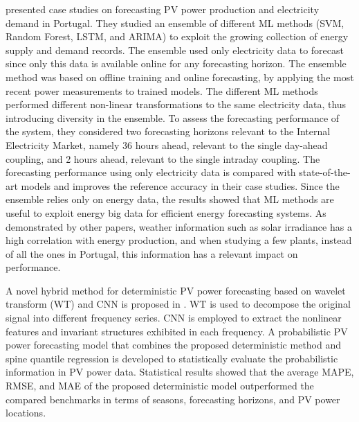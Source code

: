 \cite{9248865} presented case studies on forecasting PV power production and electricity demand in Portugal.
They studied an ensemble of different ML methods (SVM, Random Forest, LSTM, and ARIMA) to exploit the growing collection of energy supply and demand records.
The ensemble used only electricity data to forecast since only this data is available online for any forecasting horizon.
The ensemble method was based on offline training and online forecasting, by applying the most recent power measurements to trained models.
The different ML methods performed different non-linear transformations to the same electricity data, thus introducing diversity in the ensemble.
To assess the forecasting performance of the system, they considered two forecasting horizons relevant to the Internal Electricity Market, namely 36 hours ahead, relevant to the single day-ahead coupling, and 2 hours ahead, relevant to the single intraday coupling.
The forecasting performance using only electricity data is compared with state-of-the-art models and improves the reference accuracy in their case studies.
Since the ensemble relies only on energy data, the results showed that ML methods are useful to exploit energy big data for efficient energy forecasting systems.
As demonstrated by other papers, weather information such as solar irradiance has a high correlation with energy production, and when studying a few plants, instead of all the ones in Portugal, this information has a relevant impact on performance.

A novel hybrid method for deterministic PV power forecasting based on wavelet transform (WT) and CNN is proposed in \cite{WANG2017409}.
WT is used to decompose the original signal into different frequency series.
CNN is employed to extract the nonlinear features and invariant structures exhibited in each frequency.
A probabilistic PV power forecasting model that combines the proposed deterministic method and spine quantile regression is developed to statistically evaluate the probabilistic information in PV power data.
Statistical results showed that the average MAPE, RMSE, and MAE of the proposed deterministic model outperformed the compared benchmarks in terms of seasons, forecasting horizons, and PV power locations.

